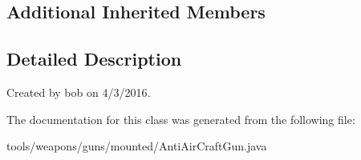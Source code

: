 \subsection*{Additional Inherited Members}


\subsection{Detailed Description}
Created by bob on 4/3/2016. 

The documentation for this class was generated from the following file\+:\begin{DoxyCompactItemize}
\item 
tools/weapons/guns/mounted/Anti\+Air\+Craft\+Gun.\+java\end{DoxyCompactItemize}
